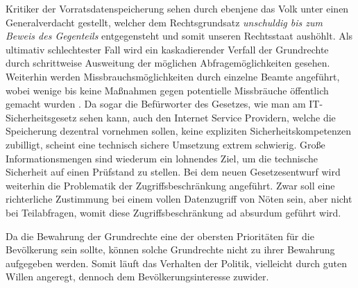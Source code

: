 \documentclass[
	12pt,
	a4paper,
	BCOR10mm,
	DIV14,
	listof=totoc,
	bibliography=totoc,
	headsepline
]{scrreprt}
\begin{document}
Kritiker der Vorratsdatenspeicherung sehen durch ebenjene das Volk unter einen Generalverdacht gestellt, welcher dem Rechtsgrundsatz \textit{unschuldig bis zum Beweis des Gegenteils} entgegensteht und somit unseren Rechtsstaat aushöhlt.
Als ultimativ schlechtester Fall wird ein kaskadierender Verfall der Grundrechte durch schrittweise Ausweitung der möglichen Abfragemöglichkeiten gesehen.
Weiterhin werden Missbrauchsmöglichkeiten durch einzelne Beamte angeführt, wobei wenige bis keine Maßnahmen gegen potentielle Missbräuche öffentlich gemacht wurden \cite{ct:vorratsdaten}.
Da sogar die Befürworter des Gesetzes, wie man am IT-Sicherheitsgesetz sehen kann, auch den Internet Service Providern, welche die Speicherung dezentral vornehmen sollen, keine expliziten Sicherheitskompetenzen zubilligt, scheint eine technisch sichere Umsetzung extrem schwierig.
Große Informationsmengen sind wiederum ein lohnendes Ziel, um die technische Sicherheit auf einen Prüfstand zu stellen.
Bei dem neuen Gesetzesentwurf wird weiterhin die Problematik der Zugriffsbeschränkung angeführt.
Zwar soll eine richterliche Zustimmung bei einem vollen Datenzugriff von Nöten sein, aber nicht bei Teilabfragen, womit diese Zugriffsbeschränkung ad absurdum geführt wird.

Da die Bewahrung der Grundrechte eine der obersten Prioritäten für die Bevölkerung sein sollte, können solche Grundrechte nicht zu ihrer Bewahrung aufgegeben werden.
Somit läuft das Verhalten der Politik, vielleicht durch guten Willen angeregt, dennoch dem Bevölkerungsinteresse zuwider.


\end{document}
